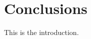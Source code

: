 \documentclass{standalone}
\begin{document}
\chapter{Conclusions}

This is the introduction. \cite{Weber2011,Sarathy2013}
\end{document}

